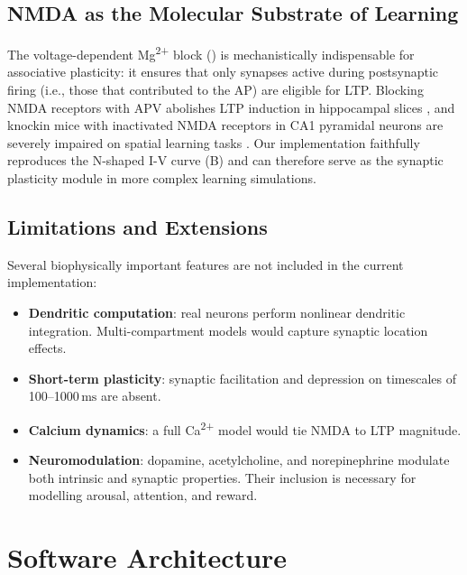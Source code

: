 \documentclass[11pt, a4paper, twocolumn]{article}
\newcommand{\ms}{\ensuremath{\,\mathrm{ms}}}
\begin{document}
\subsection{NMDA as the Molecular Substrate of Learning}

The voltage-dependent Mg\textsuperscript{2+} block ()
is mechanistically indispensable for associative plasticity: it ensures that
only synapses active during postsynaptic firing (i.e., those that contributed
to the AP) are eligible for LTP. Blocking NMDA receptors with APV abolishes
LTP induction in hippocampal slices \citep{Bliss1993}, and knockin mice
with inactivated NMDA receptors in CA1 pyramidal neurons are severely impaired
on spatial learning tasks \citep{Tsien1996}. Our implementation faithfully
reproduces the N-shaped I-V curve (B) and can therefore
serve as the synaptic plasticity module in more complex learning simulations.

\subsection{Limitations and Extensions}

Several biophysically important features are not included in the current
implementation:

\begin{itemize}[leftmargin=1.2em, itemsep=2pt]
  \item \textbf{Dendritic computation}: real neurons perform nonlinear
    dendritic integration. Multi-compartment models \citep{Mainen1996}
    would capture synaptic location effects.
  \item \textbf{Short-term plasticity}: synaptic facilitation and depression
    on timescales of 100--1000\ms \citep{Tsodyks1997} are absent.
  \item \textbf{Calcium dynamics}: a full Ca\textsuperscript{2+} model
    \citep{Bhatt2009} would tie NMDA to LTP magnitude.
  \item \textbf{Neuromodulation}: dopamine, acetylcholine, and norepinephrine
    modulate both intrinsic and synaptic properties. Their inclusion is
    necessary for modelling arousal, attention, and reward.
\end{itemize}

\section{Software Architecture}
\label{sec:software}
\end{document}
